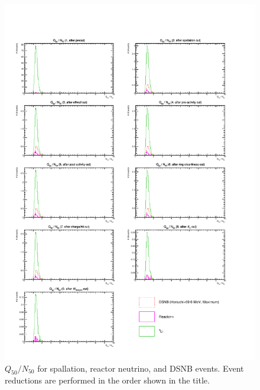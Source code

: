 \begin{figure}[h]
	\centering
	\includegraphics[width=15cm]{PDF/Dist_Nuebar/Che_50deg_tag_ge1/q50n50}
	\caption[$Q_{50}/N_{50}$ for spallation, reactor neutrino, and DSNB events]{
	$Q_{50}/N_{50}$ for spallation, reactor neutrino, and DSNB events.
	Event reductions are performed in the order shown in the title.
	}\label{Nuebar_q50n50}
\end{figure}

